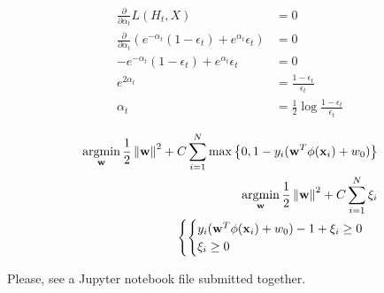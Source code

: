 \documentclass{introtosml}
\newcommand{\x}{\vec{x}}
\newcommand{\w}{\vec{w}}
\newcommand{\e}[1]{\epsilon_{#1}}
\begin{document}
\begin{p}
  \item
    \begin{align*}
      \frac{\partial}{\partial \alpha_t} L(H_t, X) & = 0 \\
      \frac{\partial}{\partial \alpha_t} \left(
        e^{-\alpha_t} (1 - \e{t}) + e^{\alpha_t} \e{t}
      \right) & = 0 \\
      - e^{-\alpha_t} (1 - \e{t}) + e^{\alpha_t} \e{t} & = 0 \\
      e^{2 \alpha_t} & = \frac{1 - \e{t}}{\e{t}} \\
      \alpha_t & = \frac{1}{2} \log \frac{1 - \e{t}}{\e{t}}
    \end{align*}

  \item
    \begin{align*}
      \argmin_\w \frac{1}{2} \norm{\w}^2
      + C \sum_{i=1}^N \max \left\{ 0, 1 - y_i (\w^T \phi(\x_i) + w_0) \right\} \\
      \argmin_\w \frac{1}{2} \norm{\w}^2 + C \sum_{i=1}^N \xi_i \\
      \left\{ \begin{cases}
        y_i (\w^T \phi(\x_i) + w_0) - 1 + \xi_i \ge 0 \\
        \xi_i \ge 0
      \end{cases} \right. \\
    \end{align*}

  \item
    Please, see a Jupyter notebook file submitted together.
\end{p}
\end{document}
